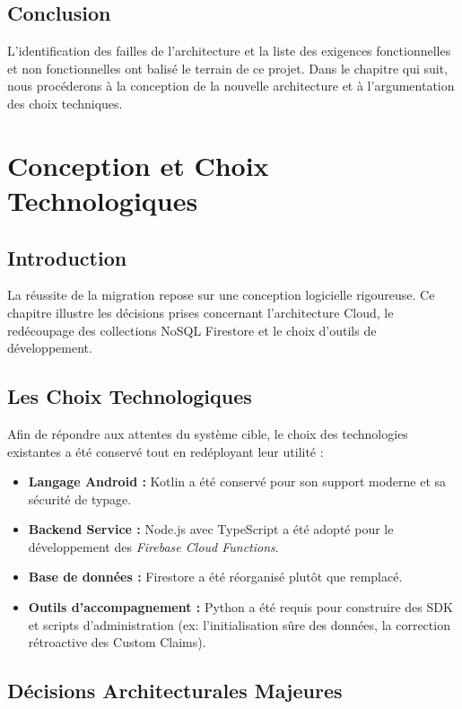 \documentclass[12pt,a4paper]{report}
\begin{document}
\section{Conclusion}
L'identification des failles de l'architecture et la liste des exigences fonctionnelles et non fonctionnelles ont balisé le terrain de ce projet. Dans le chapitre qui suit, nous procéderons à la conception de la nouvelle architecture et à l'argumentation des choix techniques.

\chapter{Conception et Choix Technologiques}

\section{Introduction}
La réussite de la migration repose sur une conception logicielle rigoureuse. Ce chapitre illustre les décisions prises concernant l'architecture Cloud, le redécoupage des collections NoSQL Firestore et le choix d'outils de développement.

\section{Les Choix Technologiques}
Afin de répondre aux attentes du système cible, le choix des technologies existantes a été conservé tout en redéployant leur utilité :
\begin{itemize}
    \item \textbf{Langage Android :} Kotlin a été conservé pour son support moderne et sa sécurité de typage.
    \item \textbf{Backend Service :} Node.js avec TypeScript a été adopté pour le développement des \textit{Firebase Cloud Functions}.
    \item \textbf{Base de données :} Firestore a été réorganisé plutôt que remplacé.
    \item \textbf{Outils d'accompagnement :} Python a été requis pour construire des SDK et scripts d'administration (ex: l'initialisation sûre des données, la correction rétroactive des Custom Claims).
\end{itemize}

\section{Décisions Architecturales Majeures}
\end{document}
